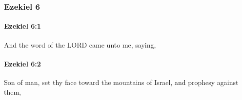 	\subsubsection{Ezekiel 6} %
		\label{EZEKIEL-6}

		\paragraph{Ezekiel 6:1} %
			\label{EZEKIEL-6-1}

			And the word of the LORD came unto me, saying,


		\paragraph{Ezekiel 6:2} %
			\label{EZEKIEL-6-2}

			Son of man, set thy face toward the mountains of Israel, and prophesy against them,

